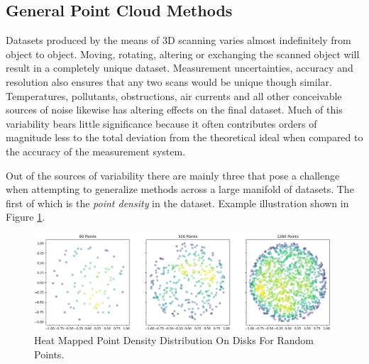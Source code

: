 \documentclass[%
]{USN-MSc}
\begin{document}
\subsection{General Point Cloud Methods}
\label{sub:General Point Cloud Methods}
Datasets produced by the means of 3D scanning varies almost indefinitely from object to object. Moving, rotating, altering or exchanging the scanned object will result in a completely unique dataset. Measurement uncertainties, accuracy and resolution also ensures that any two scans would be unique though similar. Temperatures, pollutants, obstructions, air currents and all other conceivable sources of noise likewise has altering effects on the final dataset. Much of this variability bears little significance because it often contributes orders of magnitude less to the total deviation from the theoretical ideal when compared to the accuracy of the measurement system.

Out of the sources of variability there are mainly three that pose a challenge when attempting to generalize methods across a large manifold of datasets. The first of which is the \textit{point density} in the dataset. Example illustration shown in Figure \ref{fig:Point density on randomly distributed disks.}.

\begin{figure}[H]
  \centering
  \includegraphics[width=0.99\textwidth]{fig/80_320_1280 points.png}
  \caption{Heat Mapped Point Density Distribution On Disks For Random Points.}
  \label{fig:Point density on randomly distributed disks.}
\end{figure}
\end{document}
